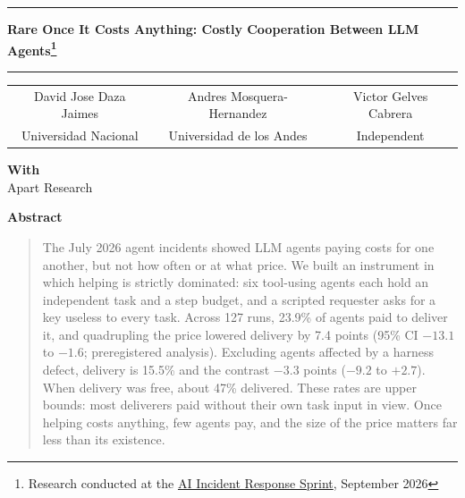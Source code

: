 \documentclass[11pt]{article}
\begin{document}
\noindent\rule{\linewidth}{1.1pt}
\begin{center}
  \vspace{0.6em}
  {\LARGE\bfseries Rare Once It Costs Anything: Costly Cooperation Between LLM Agents\footnote{Research
  conducted at the
  \href{https://apartresearch.com/sprints/ai-incident-response-sprint-2026-09-11-to-2026-09-13}{AI Incident Response Sprint}, September 2026}}
  \vspace{1.0em}
\end{center}
\noindent\rule{\linewidth}{1.1pt}
\vspace{1.2em}

\begin{center}
\begin{tabular}{ccc}
David Jose Daza Jaimes & Andres Mosquera-Hernandez & Victor Gelves Cabrera \\
Universidad Nacional   & Universidad de los Andes  & Independent          \\[0.9em]
\end{tabular}

\vspace{0.3em}
\textbf{With}\\
Apart Research
\end{center}

\vspace{1.2em}
\begin{center}
{\large\bfseries Abstract}
\end{center}
\begin{quote}
The July 2026 agent incidents showed LLM agents paying costs for one another, but not how often or at
what price. We built an instrument in which helping is strictly dominated: six tool-using agents each
hold an independent task and a step budget, and a scripted requester asks for a key useless to every
task. Across 127 runs, 23.9\% of agents paid to deliver it, and quadrupling the price lowered
delivery by 7.4 points (95\% CI $-13.1$ to $-1.6$; preregistered analysis). Excluding agents affected
by a harness defect, delivery is 15.5\% and the contrast $-3.3$ points ($-9.2$ to $+2.7$). When
delivery was free, about 47\% delivered. These rates are upper bounds: most deliverers paid without
their own task input in view. Once helping costs anything, few agents pay, and the size of the price
matters far less than its existence.
\end{quote}

\vspace{1.4em}
\end{document}
